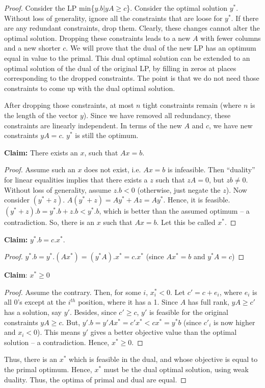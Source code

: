 \documentclass[11pt]{article}
\begin{document}
\begin{proof}
Consider the LP min\{$y.b|yA\geq c$\}. Consider the optimal solution $y^*$. Without loss of generality, ignore all the constraints that are loose for $y^*$. If there are any redundant constraints, drop them.  Clearly, these changes cannot alter the optimal solution. Dropping these constraints leads to a new $A$ with fewer columns and a new shorter $c$. We will prove that the dual of the new LP has an optimum equal in value to the primal. This dual optimal solution can be extended to an optimal solution of the dual of the original LP, by filling in zeros at places corresponding to the dropped constraints. The point is that we do not need those constraints to come up with the dual optimal solution.

After dropping those constraints, at most $n$ tight constraints remain (where $n$ is the length of the vector $y$). Since we have removed all redundancy, these constraints are linearly independent. In terms of the new $A$ and $c$, we have new constraints $yA=c$. $y^*$ is still the optimum.

\textbf{Claim:} There exists an $x$, such that $Ax=b$.

\begin{proof}
Assume such an $x$ does not exist, i.e. $Ax=b$ is infeasible. Then ``duality'' for linear equalities implies that there exists a $z$ such that $zA=0$, but $zb\neq 0$. Without loss of generality, assume $z.b<0$ (otherwise, just negate the $z$). Now consider $(y^*+z)$. $A(y^*+z)=Ay^*+Az=Ay^*$. Hence, it is feasible. $(y^*+z).b=y^*.b+z.b < y^*.b$, which is better than the assumed optimum -- a contradiction. So, there is an $x$ such that $Ax=b$. Let this be called $x^*$.
\end{proof}

\textbf{Claim:} $y^*.b=c.x^*$.

\begin{proof}
$y^*.b=y^*.(Ax^*)=(y^*A).x^*=c.x^*$  (since $Ax^*=b$ and $y^*A=c$)
\end{proof}

\textbf{Claim}: $x^*\geq 0$

\begin{proof}
Assume the contrary. Then, for some $i$, $x_i^*<0$. Let $c'=c+e_i$, where $e_i$ is all 0's except at the $i^{th}$ position, where it has a 1. Since $A$ has full rank, $yA\geq c'$ has a solution, say $y'$. Besides, since $c'\geq c$, $y'$ is feasible for the original constraints $yA\geq c$. But, $y'.b = y'Ax^*=c'x^* < cx^* = y^*b$ (since $c'_i$ is now higher and $x_i < 0$). This means $y'$ gives a better objective value than the optimal solution -- a contradiction. Hence, $x^*\geq 0$.
\end{proof}

Thus, there is an $x^*$ which is feasible in the dual, and whose objective is equal to the primal optimum. Hence, $x^*$ must be the dual optimal solution, using weak duality. Thus, the optima of primal and dual are equal.

\end{proof}
\end{document}
